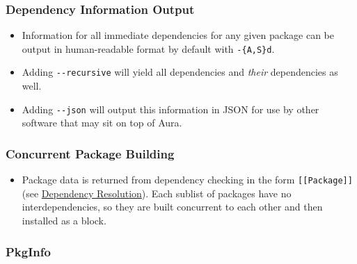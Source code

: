 \documentclass{article}
\begin{document}
\subsubsection{Dependency Information Output}\label{dependency-information-output}

\begin{itemize}
\itemsep1pt\parskip0pt
\item
  Information for all immediate dependencies for any given package can
  be output in human-readable format by default with \texttt{-\{A,S\}d}.
\item
  Adding \texttt{-\/-recursive} will yield all dependencies and
  \emph{their} dependencies as well.
\item
  Adding \texttt{-\/-json} will output this information in JSON for use
  by other software that may sit on top of Aura.
\end{itemize}

\subsubsection{Concurrent Package
Building}\label{concurrent-package-building}

\begin{itemize}
\itemsep1pt\parskip0pt
\item
  Package data is returned from dependency checking in the form
  \texttt{{[}{[}Package{]}{]}} (see
  \href{/DESIGN.md\#dependency-resolution}{Dependency Resolution}). Each
  sublist of packages have no interdependencies, so they are built
  concurrent to each other and then installed as a block.
\end{itemize}

\subsubsection{PkgInfo}\label{pkginfo}
\end{document}
